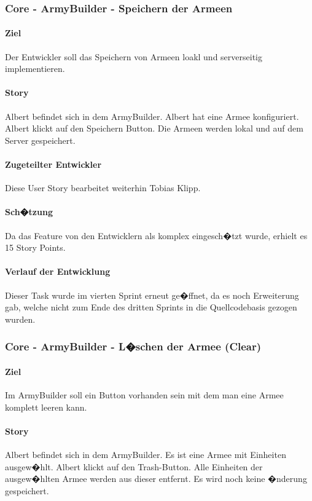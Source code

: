\documentclass[12pt, titlepage]{scrartcl}
\begin{document}
			\subsubsection{Core - ArmyBuilder - Speichern der Armeen}
			\paragraph{Ziel} Der Entwickler soll das Speichern von Armeen loakl und serverseitig implementieren.
			\paragraph{Story} Albert befindet sich in dem ArmyBuilder. Albert hat eine Armee konfiguriert. Albert klickt auf den Speichern Button. Die Armeen werden lokal und auf dem Server gespeichert.
			\paragraph{Zugeteilter Entwickler} Diese User Story bearbeitet weiterhin Tobias Klipp.
			\paragraph{Sch�tzung}
			Da das Feature von den Entwicklern als komplex eingesch�tzt wurde, erhielt es 15 Story Points.
			\paragraph{Verlauf der Entwicklung} Dieser Task wurde im vierten Sprint erneut ge�ffnet, da es noch Erweiterung gab, welche nicht zum Ende des dritten Sprints in die Quellcodebasis gezogen wurden.
			
			\subsubsection{Core - ArmyBuilder - L�schen der Armee (Clear)}
			\paragraph{Ziel} Im ArmyBuilder soll ein Button vorhanden sein mit dem man eine Armee komplett leeren kann.
			\paragraph{Story}Albert befindet sich in dem ArmyBuilder. Es ist eine Armee mit Einheiten ausgew�hlt. Albert klickt auf den Trash-Button. Alle Einheiten der ausgew�hlten Armee werden aus dieser entfernt. Es wird noch keine �nderung gespeichert.
\end{document}
